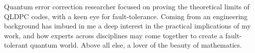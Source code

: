 

\begin{cvparagraph}
Quantum error correction researcher focused on proving the theoretical limits of QLDPC codes, with a keen eye for fault-tolerance. Coming from an engineering background has imbued in me a deep interest in the practical implications of my work, and how experts across disciplines may come together to create a fault-tolerant quantum world. Above all else, a lover of the beauty of mathematics.
\end{cvparagraph}


